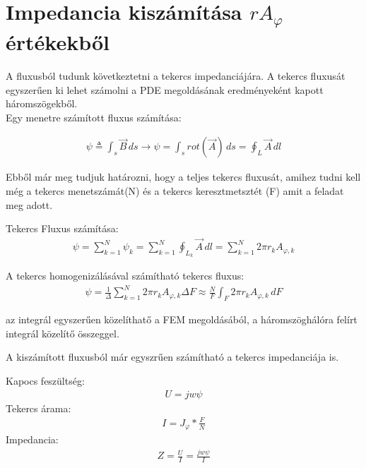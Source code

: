 \section{Impedancia kiszámítása $rA_{\varphi}$ értékekből}


A fluxusból tudunk következtetni a tekercs impedanciájára. A tekercs fluxusát
egyszerűen ki lehet számolni a PDE megoldásának eredményeként kapott háromszögekből.\\

Egy menetre számított fluxus számítása:

\begin{align}
    \psi \triangleq \int_{s}^{}  \vec{B} \,ds
    \rightarrow  \psi = \int_{s} rot(\vec{A}) \,ds
    = \oint_L \vec{A} \,dl
\end{align}

Ebből már meg tudjuk határozni, hogy a teljes tekercs fluxusát, amihez tudni kell még a
tekercs menetszámát(N) és a tekercs keresztmetsztét (F) amit a feladat meg adott.

Tekercs Fluxus számítása:
\begin{align}
    \psi = \sum_{k = 1}^{N}  \psi_k = \sum_{k = 1}^{N} \oint_{L_k} \vec{A} \,dl
    = \sum_{k = 1}^{N} 2 \pi r_k A_{\varphi,k}
\end{align}

A tekercs homogenizálásával számítható tekercs fluxus:
\begin{align}
    \psi = \frac{1}{\Delta} \sum_{k=1}^N  2 \pi r_k A_{\varphi,k} \Delta F \approx
    \frac{N}{F} \int_{F} 2 \pi r_k A_{\varphi,k} \,dF
\end{align}

az integrál egyszerűen közelíthatő a FEM megoldásából, a háromszöghálóra felírt
integrál közelítő összeggel.

A kiszámított fluxusból már egyszrűen számítható a tekercs impedanciája is.

Kapocs feszültség:
\begin{align}
    U = jw\psi
\end{align}
Tekercs árama:
\begin{align}
    I = J_{\varphi} * \frac{F}{N}
\end{align}
Impedancia:
\begin{align}
    Z = \frac{U}{I} = \frac{jw\psi}{I}
\end{align}


